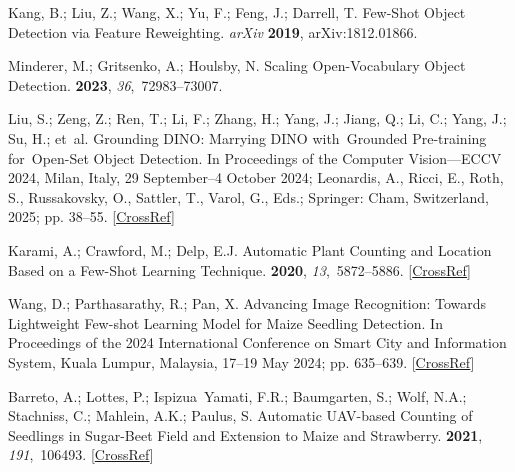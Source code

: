 \documentclass[12pt,a4paper,oneside]{report}
\begin{document}
\begin{thebibliography}{999}
Kang, B.; Liu, Z.; Wang, X.; Yu, F.; Feng, J.; Darrell, T.
\newblock Few-Shot {{Object Detection}} via {{Feature Reweighting}}. {\em arXiv} {\bf2019}, arXiv:1812.01866. 

Minderer, M.; Gritsenko, A.; Houlsby, N.
\newblock Scaling {{Open-Vocabulary Object Detection}}.
 {\bf 2023},
{\em 36},~72983--73007.

Liu, S.; Zeng, Z.; Ren, T.; Li, F.; Zhang, H.; Yang, J.; Jiang, Q.; Li, C.;
Yang, J.; Su, H.;  et~al.
\newblock Grounding {{DINO}}: {{Marrying DINO}} with~{{Grounded Pre-training}}
for~{{Open-Set Object Detection}}.
\newblock In Proceedings of the Computer {{Vision}}---{{ECCV}} 2024, Milan, Italy, 29 September--4 October 2024; Leonardis, A., Ricci, E., Roth, S., Russakovsky, O., Sattler, T., Varol, G., Eds.; Springer: Cham, Switzerland, 
2025; pp. 38--55. [\href{http://dx.doi.org/10.1007/978-3-031-72970-6_3}{CrossRef}]

Karami, A.; Crawford, M.; Delp, E.J.
\newblock Automatic {{Plant Counting}} and {{Location Based}} on a {{Few-Shot
Learning Technique}}.
 {\bf 2020}, {\em 13},~5872--5886. [\href{http://dx.doi.org/10.1109/JSTARS.2020.3025790}{CrossRef}]

Wang, D.; Parthasarathy, R.; Pan, X.
\newblock Advancing {{Image Recognition}}: {{Towards Lightweight Few-shot
Learning Model}} for {{Maize Seedling Detection}}.
\newblock In Proceedings of the 2024 {{International Conference}} on {{Smart City}} and {{Information System}}, Kuala Lumpur, Malaysia, 17--19 May 2024; pp. 635--639. [\href{http://dx.doi.org/10.1145/3685088.3685198}{CrossRef}]

Barreto, A.; Lottes, P.; Ispizua~Yamati, F.R.; Baumgarten, S.; Wolf, N.A.;
Stachniss, C.; Mahlein, A.K.; Paulus, S.
\newblock Automatic {{UAV-based}} Counting of Seedlings in Sugar-Beet Field and
Extension to Maize and Strawberry.
 {\bf 2021}, {\em
191},~106493. [\href{http://dx.doi.org/10.1016/j.compag.2021.106493}{CrossRef}]


\end{thebibliography}
\end{document}
